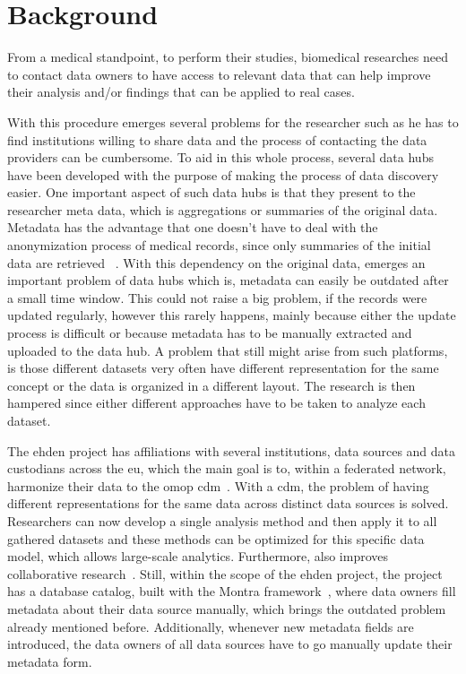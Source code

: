 \chapter{Background}
\label{chapter:background}

From a medical standpoint, to perform their studies, biomedical researches need to
contact data owners to have access to relevant data that can help improve their
analysis and/or findings that can be applied to real cases.


With this procedure emerges several problems for the researcher such as he has to find
institutions willing to share data and the process of contacting the data providers can
be cumbersome.
To aid in this whole process, several data hubs have been developed with the purpose of
making the process of data discovery easier.
One important aspect of such data hubs is that they present to the researcher meta
data, which is aggregations or summaries of the original data.
Metadata has the advantage that one doesn't have to deal with the anonymization process
of medical records, since only summaries of the initial data are retrieved
~\cite{egenvar, montra}.
With this dependency on the original data, emerges an important problem of data hubs
which is, metadata can easily be outdated after a small time window.
This could not raise a big problem, if the records were updated regularly, however this
rarely happens, mainly because either the update process is difficult or because
metadata has to be manually extracted and uploaded to the data hub.
A problem that still might arise from such platforms, is those different datasets very
often have different representation for the same concept or the data is organized in a
different layout.
The research is then hampered since either different approaches have to be taken to
analyze each dataset.

The \gls{ehden} project has affiliations with several institutions, data sources and
data custodians across the \gls{eu}, which the main goal is to, within a federated
network, harmonize their data to the \gls{omop} \gls{cdm}~\cite{ehden-datapartners}.
With a \gls{cdm}, the problem of having different representations for the same data
across distinct data sources is solved.
Researchers can now develop a single analysis method and then apply it to all gathered
datasets and these methods can be optimized for this specific data model, which allows
large-scale analytics.
Furthermore, also improves collaborative research~\cite{ohdsi-site}.
Still, within the scope of the \gls{ehden} project, the project has a database catalog,
built with the Montra framework~\cite{montra}, where data owners fill metadata about
their data source manually, which brings the outdated problem already mentioned before.
Additionally, whenever new metadata fields are introduced, the data owners of all data
sources have to go manually update their metadata form.

